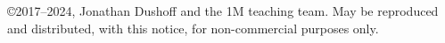 \copyright 2017--2024, Jonathan Dushoff and the 1M teaching team.  May be reproduced and distributed, with this notice, for non-commercial purposes only.

